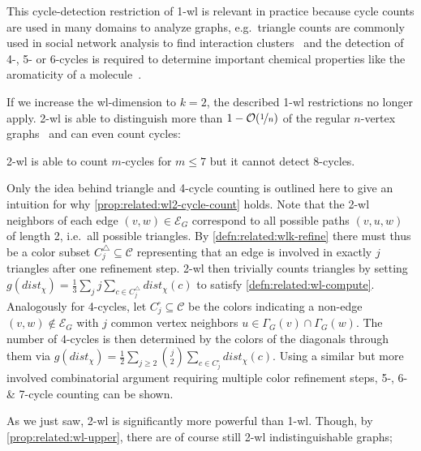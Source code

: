 This cycle-detection restriction of 1-\acs{wl} is relevant in practice because cycle counts are used in many domains to analyze graphs, e.g.\ triangle counts are commonly used in social network analysis to find interaction clusters~\cite{Milo2002}\cite{Newman2003}\cite{Welser2007} and the detection of 4-, 5- or 6-cycles is required to determine important chemical properties like the aromaticity of a molecule~\cite{Adamson1973}\cite{Kekule1866}.

If we increase the \acs{wl}-dimension to $k = 2$, the described 1-\acs{wl} restrictions no longer apply.
2-\acs{wl} is able to distinguish more than $1 - \mathcal{O}(\nicefrac{1}{n})$ of the regular $n$-vertex graphs~\cite[cor.~1.8.6]{Immerman1990} and can even count cycles:
\begin{prop}\label{prop:related:wl2-cycle-count}
	2-\acs{wl} is able to count $m$-cycles for $m \leq 7$ but it cannot detect 8-cycles.
\end{prop}
\begin{hproof}
	Only the idea behind triangle and 4-cycle counting is outlined here to give an intuition for why \cref{prop:related:wl2-cycle-count} holds.
	Note that the 2-\acs{wl} neighbors of each edge $(v, w) \in \mathcal{E}_G$ correspond to all possible paths $(v, u, w)$ of length 2, i.e.\ all possible triangles.
	By \cref{defn:related:wlk-refine} there must thus be a color subset $C^{\triangle}_j \subseteq \mathcal{C}$ representing that an edge is involved in exactly $j$ triangles after one refinement step.
	2-\acs{wl} then trivially counts triangles by setting $g(\mathit{dist}_\chi) = \frac{1}{3} \sum_j j \sum_{c \in C^{\triangle}_j} \mathit{dist}_\chi(c)$ to satisfy \cref{defn:related:wl-compute}.
	Analogously for 4-cycles, let $C^{\square}_j \subseteq \mathcal{C}$ be the colors indicating a non-edge $(v, w) \notin \mathcal{E}_G$ with $j$ common vertex neighbors $u \in \Gamma_G(v) \cap \Gamma_G(w)$.
	The number of 4-cycles is then determined by the colors of the diagonals through them via $g(\mathit{dist}_\chi) = \frac{1}{2} \sum_{j \geq 2} \binom{j}{2} \sum_{c \in C^{\square}_j} \mathit{dist}_\chi(c)$.
	Using a similar but more involved combinatorial argument requiring multiple color refinement steps, 5-, 6- \& 7-cycle counting can be shown.
\end{hproof}
As we just saw, 2-\acs{wl} is significantly more powerful than 1-\acs{wl}.
Though, by \cref{prop:related:wl-upper}, there are of course still 2-\acs{wl} indistinguishable graphs;
